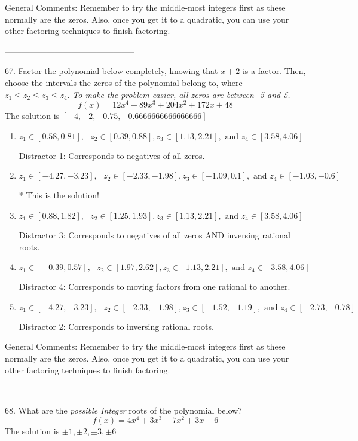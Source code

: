 \documentclass{extbook}[14pt]
\begin{document}
General Comments: Remember to try the middle-most integers first as these normally are the zeros. Also, once you get it to a quadratic, you can use your other factoring techniques to finish factoring.

-----------------------------------------------

67. Factor the polynomial below completely, knowing that $x+2$ is a factor. Then, choose the intervals the zeros of the polynomial belong to, where $z_1 \leq z_2 \leq z_3 \leq z_4$. \textit{To make the problem easier, all zeros are between -5 and 5.}
\[ f(x) = 12x^{4} +89 x^{3} +204 x^{2} +172 x + 48 \] 
The solution is $ [-4, -2, -0.75, -0.6666666666666666] $ 

\begin{enumerate}[label=\Alph*.] 
\item $ z_1 \in [0.58, 0.81], \text{   }  z_2 \in [0.39, 0.88], z_3 \in [1.13, 2.21], \text{   and   } z_4 \in [3.58, 4.06] $ 

  Distractor 1: Corresponds to negatives of all zeros. 
\item $ z_1 \in [-4.27, -3.23], \text{   }  z_2 \in [-2.33, -1.98], z_3 \in [-1.09, 0.1], \text{   and   } z_4 \in [-1.03, -0.6] $ 

 * This is the solution! 
\item $ z_1 \in [0.88, 1.82], \text{   }  z_2 \in [1.25, 1.93], z_3 \in [1.13, 2.21], \text{   and   } z_4 \in [3.58, 4.06] $ 

  Distractor 3: Corresponds to negatives of all zeros AND inversing rational roots. 
\item $ z_1 \in [-0.39, 0.57], \text{   }  z_2 \in [1.97, 2.62], z_3 \in [1.13, 2.21], \text{   and   } z_4 \in [3.58, 4.06] $ 

  Distractor 4: Corresponds to moving factors from one rational to another. 
\item $ z_1 \in [-4.27, -3.23], \text{   }  z_2 \in [-2.33, -1.98], z_3 \in [-1.52, -1.19], \text{   and   } z_4 \in [-2.73, -0.78] $ 

  Distractor 2: Corresponds to inversing rational roots. 
\end{enumerate} 
 
General Comments: Remember to try the middle-most integers first as these normally are the zeros. Also, once you get it to a quadratic, you can use your other factoring techniques to finish factoring.

-----------------------------------------------

68. What are the \textit{possible Integer} roots of the polynomial below?
\[ f(x) = 4x^{4} +3 x^{3} +7 x^{2} +3 x + 6 \] 
The solution is $ \pm 1,\pm 2,\pm 3,\pm 6 $ 
\end{document}
